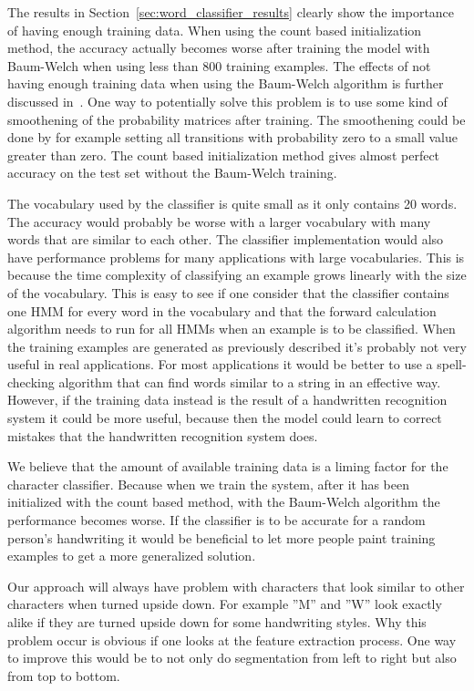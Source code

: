 The results in Section~\ref{sec:word_classifier_results} clearly show the importance of having enough training data.
When using the count based initialization method, the accuracy actually becomes worse after training the model with Baum-Welch when using less than 800 training examples.
The effects of not having enough training data when using the Baum-Welch algorithm is further discussed in~\cite{Rabiner1989}.
One way to potentially solve this problem is to use some kind of smoothening of the probability matrices after training.
The smoothening could be done by for example setting all transitions with probability zero to a small value greater than zero.
The count based initialization method gives almost perfect accuracy on the test set without the Baum-Welch training.

The vocabulary used by the classifier is quite small as it only contains 20 words.
The accuracy would probably be worse with a larger vocabulary with many words that are similar to each other.
The classifier implementation would also have performance problems for many applications with large vocabularies.
This is because the time complexity of classifying an example grows linearly with the size of the vocabulary.
This is easy to see if one consider that the classifier contains one HMM for every word in the vocabulary and that the forward calculation algorithm needs to run for all HMMs when an example is to be classified.
When the training examples are generated as previously described it's probably not very useful in real applications.
For most applications it would be better to use a spell-checking algorithm that can find words similar to a string in an effective way.
However, if the training data instead is the result of a handwritten recognition system it could be more useful, because then the model could learn to correct mistakes that the handwritten recognition system does.

We believe that the amount of available training data is a liming factor for the character classifier.
Because when we train the system, after it has been initialized with the count based method, with the Baum-Welch algorithm the performance becomes worse.
If the classifier is to be accurate for a random person's handwriting it would be beneficial to let more people paint training examples to get a more generalized solution.

Our approach will always have problem with characters that look similar to other characters when turned upside down.
For example ''M'' and ''W'' look exactly alike if they are turned upside down for some handwriting styles.
Why this problem occur is obvious if one looks at the feature extraction process.
One way to improve this would be to not only do segmentation from left to right but also from top to bottom.
